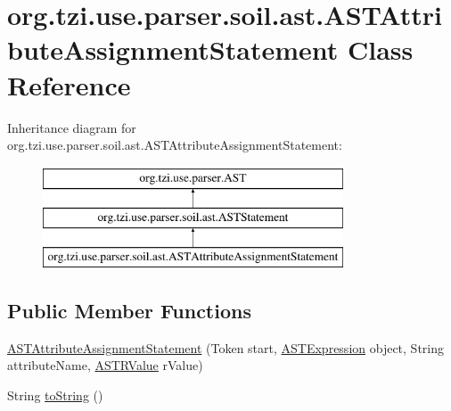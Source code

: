 \hypertarget{classorg_1_1tzi_1_1use_1_1parser_1_1soil_1_1ast_1_1_a_s_t_attribute_assignment_statement}{\section{org.\-tzi.\-use.\-parser.\-soil.\-ast.\-A\-S\-T\-Attribute\-Assignment\-Statement Class Reference}
\label{classorg_1_1tzi_1_1use_1_1parser_1_1soil_1_1ast_1_1_a_s_t_attribute_assignment_statement}
}
Inheritance diagram for org.\-tzi.\-use.\-parser.\-soil.\-ast.\-A\-S\-T\-Attribute\-Assignment\-Statement\-:\begin{figure}[H]
\begin{center}
\leavevmode
\includegraphics[height=3.000000cm]{classorg_1_1tzi_1_1use_1_1parser_1_1soil_1_1ast_1_1_a_s_t_attribute_assignment_statement}
\end{center}
\end{figure}
\subsection*{Public Member Functions}
\begin{DoxyCompactItemize}
\item 
\hyperlink{classorg_1_1tzi_1_1use_1_1parser_1_1soil_1_1ast_1_1_a_s_t_attribute_assignment_statement_afc819ad39482dc370b8b6aef626fe4ed}{A\-S\-T\-Attribute\-Assignment\-Statement} (Token start, \hyperlink{classorg_1_1tzi_1_1use_1_1parser_1_1ocl_1_1_a_s_t_expression}{A\-S\-T\-Expression} object, String attribute\-Name, \hyperlink{classorg_1_1tzi_1_1use_1_1parser_1_1soil_1_1ast_1_1_a_s_t_r_value}{A\-S\-T\-R\-Value} r\-Value)
\item 
String \hyperlink{classorg_1_1tzi_1_1use_1_1parser_1_1soil_1_1ast_1_1_a_s_t_attribute_assignment_statement_a0e1ecfe208d645b451e3a8e453979244}{to\-String} ()
\end{DoxyCompactItemize}
